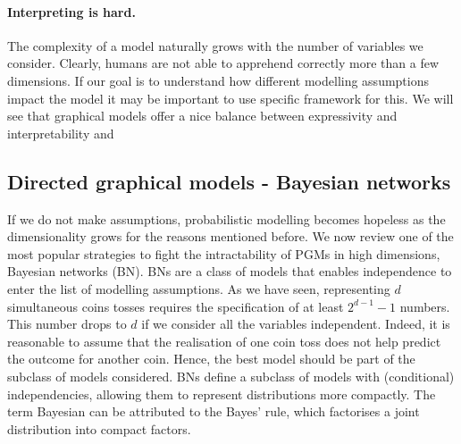 \paragraph{Interpreting is hard.} The complexity of a model naturally grows with the number of variables we consider. Clearly, humans are not able to apprehend correctly more than a few dimensions. If our goal is to understand how different modelling assumptions impact the model it may be important to use specific framework for this. We will see that graphical models offer a nice balance between expressivity and interpretability and

\subsection{Directed graphical models - Bayesian networks}
If we do not make assumptions, probabilistic modelling becomes hopeless as the dimensionality grows for the reasons mentioned before. We now review one of the most popular strategies to fight the intractability of PGMs in high dimensions, Bayesian networks (BN). BNs are a class of models that enables independence to enter the list of modelling assumptions. As we have seen, representing $d$ simultaneous coins tosses requires the specification of at least $2^{d-1} - 1$ numbers. This number drops to $d$ if we consider all the variables independent. Indeed, it is reasonable to assume that the realisation of one coin toss does not help predict the outcome for another coin. Hence, the best model should be part of the subclass of models considered. BNs define a subclass of models with (conditional) independencies, allowing them to represent distributions more compactly. The term Bayesian can be attributed to the Bayes' rule, which factorises a joint distribution into compact factors.

